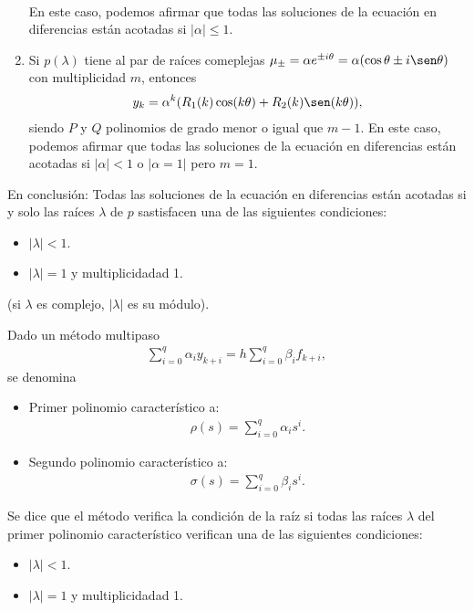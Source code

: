 \begin{enumerate}
\begin{align*}
    \end{align*}
    En este caso, podemos afirmar que todas las soluciones de la ecuación en diferencias están acotadas si $|\alpha| \leq 1$.
    \item Si $p(\lambda)$ tiene al par de raíces comeplejas $\mu_{\pm} = \alpha e^{\pm i \theta} = \alpha(\cos \theta \pm i\sen\theta)$ con multiplicidad $m$, entonces
    \begin{align*}
        y_k = \alpha^k(R_1(k)\cos(k\theta) + R_2(k)\sen(k\theta)),
    \end{align*}
    siendo $P$ y $Q$ polinomios de grado menor o igual que $m-1$. En este caso, podemos afirmar que todas las soluciones de la ecuación en diferencias están acotadas si $|\alpha| < 1$ o $|\alpha = 1|$ pero $m = 1$.

\end{enumerate}
En conclusión: Todas las soluciones de la ecuación en diferencias están acotadas si y solo las raíces $\lambda$ de $p$ sastisfacen una de las siguientes condiciones:
\begin{itemize}
    \item $|\lambda| < 1$.
    \item $|\lambda| = 1$ y multiplicidadad 1.
\end{itemize}
(si $\lambda$ es complejo, $|\lambda|$ es su módulo).

\begin{defi}
Dado un método multipaso
\begin{align*}
    \sum_{i=0}^{q} \alpha_i y_{k+i} = h\sum_{i=0}^{q} \beta_i f_{k+i},
\end{align*}
se denomina
\begin{itemize}
    \item Primer polinomio característico a:
    \begin{align*}
        \rho(s) = \sum_{i=0}^{q} \alpha_i s^i.
    \end{align*}
    \item Segundo polinomio característico a:
    \begin{align*}
        \sigma(s) = \sum_{i=0}^{q} \beta_i s^i.
    \end{align*}
\end{itemize}
\end{defi}

\begin{defi}
Se dice que el método verifica la condición de la raíz si todas las raíces $\lambda$ del primer polinomio característico verifican una de las siguientes condiciones:
\begin{itemize}
    \item $|\lambda| < 1$.
    \item $|\lambda| = 1$ y multiplicidadad 1.
\end{itemize}
\end{defi}

